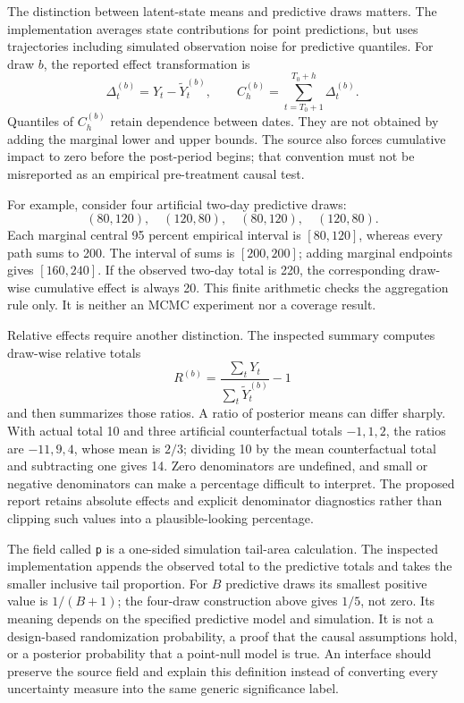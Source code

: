 The distinction between latent-state means and predictive draws matters.
The implementation averages state contributions for point predictions, but
uses trajectories including simulated observation noise for predictive
quantiles. For draw \(b\), the reported effect transformation is
\[
 \Delta_t^{(b)}=Y_t-\widetilde Y_t^{(b)},\qquad
 C_h^{(b)}=\sum_{t=T_0+1}^{T_0+h}\Delta_t^{(b)}.
\]
Quantiles of \(C_h^{(b)}\) retain dependence between dates. They are not
obtained by adding the marginal lower and upper bounds. The source also
forces cumulative impact to zero before the post-period begins; that
convention must not be misreported as an empirical pre-treatment causal
test.\cite{exec13_ci_semantics,exec13_ci_brodersen2015}

For example, consider four artificial two-day predictive draws:
\[
(80,120),\quad(120,80),\quad(80,120),\quad(120,80).
\]
Each marginal central 95 percent
empirical interval is \([80,120]\), whereas every path sums to 200. The
interval of sums is \([200,200]\); adding marginal endpoints gives
\([160,240]\). If the observed two-day total is 220, the corresponding
draw-wise cumulative effect is always 20. This finite arithmetic checks the
aggregation rule only. It is neither an MCMC experiment nor a coverage result.
\cite{exec13_cimpact_examples}

Relative effects require another distinction. The inspected summary computes
draw-wise relative totals
\[
 R^{(b)}=\frac{\sum_tY_t}{\sum_t\widetilde Y_t^{(b)}}-1
\]
and then summarizes those ratios. A ratio of posterior means can differ
sharply. With actual total 10 and three artificial counterfactual totals
\(-1,1,2\), the ratios are \(-11,9,4\), whose mean is \(2/3\); dividing
10 by the mean counterfactual total and subtracting one gives 14. Zero
denominators are undefined, and small or negative denominators can make a
percentage difficult to interpret. The proposed report retains absolute
effects and explicit denominator diagnostics rather than clipping such
values into a plausible-looking percentage.\cite{exec13_ci_semantics,exec13_cimpact_examples}

The field called \texttt{p} is a one-sided simulation tail-area calculation.
The inspected implementation appends the observed total to the predictive
totals and takes the smaller inclusive tail proportion. For \(B\) predictive
draws its smallest positive value is \(1/(B+1)\); the four-draw construction
above gives \(1/5\), not zero. Its meaning depends on the specified predictive
model and simulation. It is not a design-based randomization probability, a
proof that the causal assumptions hold, or a posterior probability that a
point-null model is true. An interface should preserve the source field and
explain this definition instead of converting every uncertainty measure into
the same generic significance label.\cite{exec13_ci_semantics,exec13_cimpact_examples}

